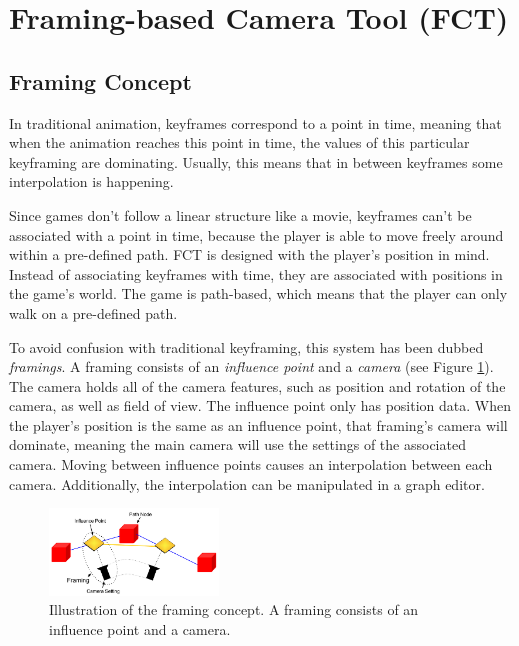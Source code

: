 \section{Framing-based Camera Tool (FCT)}
\subsection{Framing Concept}
In traditional animation, keyframes correspond to a point in time, meaning that when the animation reaches this point in time, the values of this particular keyframing are dominating. Usually, this means that in between keyframes some interpolation is happening. 


Since games don't follow a linear structure like a movie, keyframes can't be associated with a point in time, because the player is able to move freely around within a pre-defined path. FCT is designed with the player's position in mind. Instead of associating keyframes with time, they are associated with positions in the game's world. The game is path-based, which means that the player can only walk on a pre-defined path.

To avoid confusion with traditional keyframing, this system has been dubbed \textit{framings}. A framing consists of an \textit{influence point} and a \textit{camera} (see Figure \ref{fig:framingConcept}). The camera holds all of the camera features, such as position and rotation of the camera, as well as field of view. The influence point only has position data. When the player's position is the same as an influence point, that framing's camera will dominate, meaning the main camera will use the settings of the associated camera. Moving between influence points causes an interpolation between each camera. Additionally, the interpolation can be manipulated in a graph editor.

\begin{figure}[htbp]
\centering
\includegraphics[width=0.4\textwidth]{Pics/Instructions}
\caption{Illustration of the framing concept. A framing consists of an influence point and a camera.}
\label{fig:framingConcept}
\end{figure}

